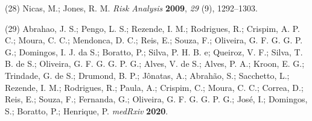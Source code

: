 \documentclass[journal=jacsat,manuscript=article]{achemso}
\begin{document}
\leavevmode\hypertarget{ref-Nicas2009}{}%
(28) Nicas, M.; Jones, R. M. \emph{Risk Analysis} \textbf{2009},
\emph{29} (9), 1292--1303.

\leavevmode\hypertarget{ref-Abrahao2020}{}%
(29) Abrahao, J. S.; Pengo, L. S.; Rezende, I. M.; Rodrigues, R.;
Crispim, A. P. C.; Moura, C. C.; Mendonca, D. C.; Reis, E.; Souza, F.;
Oliveira, G. F. G. G. P. G.; Domingos, I. J. da S.; Boratto, P.; Silva,
P. H. B. e; Queiroz, V. F.; Silva, T. B. de S.; Oliveira, G. F. G. G. P.
G.; Alves, V. de S.; Alves, P. A.; Kroon, E. G.; Trindade, G. de S.;
Drumond, B. P.; Jônatas, A.; Abrahão, S.; Sacchetto, L.; Rezende, I. M.;
Rodrigues, R.; Paula, A.; Crispim, C.; Moura, C. C.; Correa, D.; Reis,
E.; Souza, F.; Fernanda, G.; Oliveira, G. F. G. G. P. G.; José, I.;
Domingos, S.; Boratto, P.; Henrique, P. \emph{medRxiv} \textbf{2020}.
\end{document}
